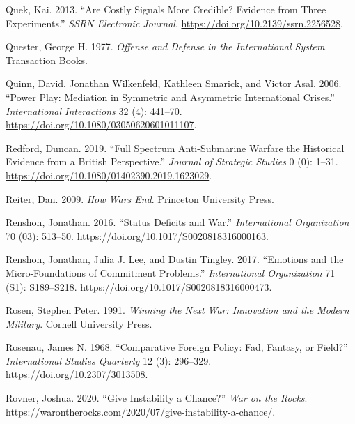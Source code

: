 \documentclass[
]{article}
\begin{document}
\leavevmode\hypertarget{ref-quek_arecostlysignals_2013}{}%
Quek, Kai. 2013. ``Are Costly Signals More Credible? Evidence from Three Experiments.'' \emph{SSRN Electronic Journal}. \url{https://doi.org/10.2139/ssrn.2256528}.

\leavevmode\hypertarget{ref-quester_offensedefenseinternational_1977}{}%
Quester, George H. 1977. \emph{Offense and Defense in the International System}. Transaction Books.

\leavevmode\hypertarget{ref-quinn_powerplaymediation_2006}{}%
Quinn, David, Jonathan Wilkenfeld, Kathleen Smarick, and Victor Asal. 2006. ``Power Play: Mediation in Symmetric and Asymmetric International Crises.'' \emph{International Interactions} 32 (4): 441--70. \url{https://doi.org/10.1080/03050620601011107}.

\leavevmode\hypertarget{ref-redford_fullspectrumantisubmarine_2019}{}%
Redford, Duncan. 2019. ``Full Spectrum Anti-Submarine Warfare the Historical Evidence from a British Perspective.'' \emph{Journal of Strategic Studies} 0 (0): 1--31. \url{https://doi.org/10.1080/01402390.2019.1623029}.

\leavevmode\hypertarget{ref-reiter_howwarsend_2009}{}%
Reiter, Dan. 2009. \emph{How Wars End}. Princeton University Press.

\leavevmode\hypertarget{ref-renshon_statusdeficitswar_2016}{}%
Renshon, Jonathan. 2016. ``Status Deficits and War.'' \emph{International Organization} 70 (03): 513--50. \url{https://doi.org/10.1017/S0020818316000163}.

\leavevmode\hypertarget{ref-renshon_emotionsmicrofoundationscommitment_2017}{}%
Renshon, Jonathan, Julia J. Lee, and Dustin Tingley. 2017. ``Emotions and the Micro-Foundations of Commitment Problems.'' \emph{International Organization} 71 (S1): S189--S218. \url{https://doi.org/10.1017/S0020818316000473}.

\leavevmode\hypertarget{ref-rosen_winningnextwar_1991}{}%
Rosen, Stephen Peter. 1991. \emph{Winning the Next War: Innovation and the Modern Military}. Cornell University Press.

\leavevmode\hypertarget{ref-rosenau_comparativeforeignpolicy_1968}{}%
Rosenau, James N. 1968. ``Comparative Foreign Policy: Fad, Fantasy, or Field?'' \emph{International Studies Quarterly} 12 (3): 296--329. \url{https://doi.org/10.2307/3013508}.

\leavevmode\hypertarget{ref-rovner_giveinstabilitychance_2020}{}%
Rovner, Joshua. 2020. ``Give Instability a Chance?'' \emph{War on the Rocks}. https://warontherocks.com/2020/07/give-instability-a-chance/.
\end{document}
